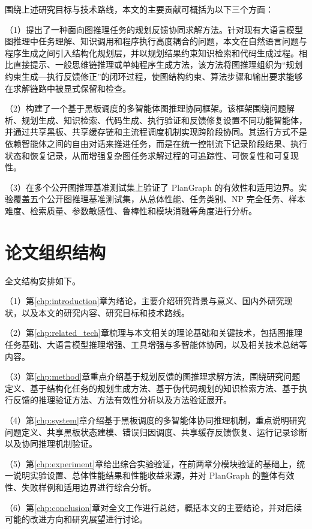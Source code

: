 围绕上述研究目标与技术路线，本文的主要贡献可概括为以下三个方面：



（1）提出了一种面向图推理任务的规划反馈协同求解方法。针对现有大语言模型图推理中任务理解、知识调用和程序执行高度耦合的问题，本文在自然语言问题与程序生成之间引入结构化规划层，并以规划结果约束知识检索和代码生成过程。相比直接提示、一般思维链推理或单纯程序生成方法，该方法将图推理组织为“规划约束生成—执行反馈修正”的闭环过程，使图结构约束、算法步骤和输出要求能够在求解链路中被显式保留和检查。

（2）构建了一个基于黑板调度的多智能体图推理协同框架。该框架围绕问题解析、规划生成、知识检索、代码生成、执行验证和反馈修复设置不同功能智能体，并通过共享黑板、共享缓存链和主流程调度机制实现跨阶段协同。其运行方式不是依赖智能体之间的自由对话来推进任务，而是在统一控制流下记录阶段结果、执行状态和恢复记录，从而增强复杂图任务求解过程的可追踪性、可恢复性和可复现性。

（3）在多个公开图推理基准测试集上验证了 PlanGraph 的有效性和适用边界。实验覆盖五个公开图推理基准测试集，从总体性能、任务类别、NP 完全任务、样本难度、检索质量、参数敏感性、鲁棒性和模块消融等角度进行分析。

\section{论文组织结构}

全文结构安排如下。

（1）第\ref{chp:introduction}章为绪论，主要介绍研究背景与意义、国内外研究现状，以及本文的研究内容、研究目标和技术路线。

（2）第\ref{chp:related_tech}章梳理与本文相关的理论基础和关键技术，包括图推理任务基础、大语言模型推理增强、工具增强与多智能体协同，以及相关技术总结等内容。

（3）第\ref{chp:method}章重点介绍基于规划反馈的图推理求解方法，围绕研究问题定义、基于结构化任务的规划生成方法、基于伪代码规划的知识检索方法、基于执行反馈的推理验证方法、方法有效性分析以及方法验证展开。

（4）第\ref{chp:system}章介绍基于黑板调度的多智能体协同推理机制，重点说明研究问题定义、共享黑板状态建模、错误归因调度、共享缓存反馈恢复、运行记录诊断以及协同推理机制验证。

（5）第\ref{chp:experiment}章给出综合实验验证，在前两章分模块验证的基础上，统一说明实验设置、总体性能结果和性能收益来源，并对 PlanGraph 的整体有效性、失败样例和适用边界进行综合分析。

（6）第\ref{chp:conclusion}章对全文工作进行总结，概括本文的主要结论，并对后续可能的改进方向和研究展望进行讨论。
